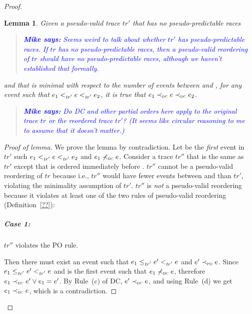 \documentclass[letter,10pt]{article}
\newtheorem{lem}{Lemma}
\newcommand{\tr}{\ensuremath{\mathit{tr}}\xspace}
\newcommand{\trPrime}{\ensuremath{\mathit{tr'}}\xspace}
\newcommand{\trDoublePrime}{\ensuremath{\mathit{tr''}}\xspace}
\newcommand{\PO}{PO\xspace}
\newcommand{\WDC}{DC\xspace}
\newcommand{\BR}{BR\xspace}
\newcommand{\WBR}{W\BR}
\newcommand{\DC}{\WDC}
\newcommand{\DCOrdered}[2]{\WDCOrdered{#1}{#2}}
\newcommand{\nDCOrdered}[2]{\nWDCOrdered{#1}{#2}}
\newcommand{\ltTRPrime}{\ensuremath{<_\textsc{\trPrime}}\xspace}
\newcommand{\ltEqTRPrime}{\ensuremath{\leq_\textsc{\trPrime}}\xspace}
\newcommand{\ltPO}{\ensuremath{\prec_\textsc{\tiny{\PO}}}\xspace}
\newcommand{\ltWDC}{\ensuremath{\prec_\textsc{\tiny{\WDC}}}\xspace}
\newcommand{\nltWDC}{\ensuremath{\not\prec_\textsc{\tiny{\WDC}}}\xspace}
\newcommand{\nltWBR}{\ensuremath{\not\prec_\textsc{\tiny{\WBR}}}\xspace}
\newcommand{\Ordered}[3]{\ensuremath{#1 #2 #3}}
\newcommand{\TRPrimeOrdered}[2]{\Ordered{#1}{\ltTRPrime}{#2}}
\newcommand{\EqTRPrimeOrdered}[2]{\Ordered{#1}{\ltEqTRPrime}{#2}}
\newcommand{\POOrdered}[2]{\Ordered{#1}{\ltPO}{#2}}
\newcommand{\WDCOrdered}[2]{\Ordered{#1}{\ltWDC}{#2}}
\newcommand{\nWDCOrdered}[2]{\Ordered{#1}{\nltWDC}{#2}}
\newcommand{\nWBROrdered}[2]{\Ordered{#1}{\nltWBR}{#2}}
\newcommand{\originalgrumbler}[2]{\begin{quote}\textcolor{blue}{\sl{\bf #1 says:} #2}\end{quote}}
\newcommand{\grumbler}[2]{\originalgrumbler{#1}{#2}}
\newcommand{\mike}[1]{\grumbler{Mike}{#1}}
\begin{document}
\begin{proof}
\begin{lem}
  Given a pseudo-valid trace \trPrime that has no pseudo-predictable races
  \mike{Seems weird to talk about whether \trPrime has pseudo-predictable races.
  If \tr has no pseudo-predictable races, then a pseudo-valid reordering of \tr should have no pseudo-predictable races, although we haven't established that formally.}
  and
  that is minimal with respect to the number of events between  and
  , for any event  such that
  \TRPrimeOrdered{\event{e}{_1}}{\TRPrimeOrdered{\event{e}}{\event{e}{_2}}}, it
  is true that \DCOrdered{\event{e}{_1}}{\DCOrdered{\event{e}}{\event{e}{_2}}}.
  \mike{Do \DC and other partial orders here apply to the original trace \tr or the reordered trace \trPrime?
  (It seems like circular reasoning to me to assume that it doesn't matter.)}
  \label{lem:wbr:dc-between-e1-e2}
\end{lem}

\begin{proof}[Proof of lemma]

  We prove the lemma by contradiction.
  Let  be the \emph{first} event in \trPrime such
  \TRPrimeOrdered{\event{e}{_1}}{\TRPrimeOrdered{\event{e}}{\event{e}{_2}}} and
  \nDCOrdered{\event{e}{_1}}{\event{e}}.
  Consider a trace \trDoublePrime that is the
  same as \trPrime except that  is ordered immediately before .
  \trDoublePrime cannot be a pseudo-valid reordering of \tr because
  i.e., \trDoublePrime would have fewer events between  and  than \trPrime,
  violating the minimality assumption of \trPrime.
  \trDoublePrime is \emph{not} a pseudo-valid reordering because it violates
  at least one of the two rules of pseudo-valid reordering (Definition~\ref{??}):

  \subparagraph{Case 1:}
  \trDoublePrime violates the \PO rule.
  
  Then there must exist an event  such that
  \EqTRPrimeOrdered{\event{e}{_1}}{\TRPrimeOrdered{\event{e}{'}}{\event{e}}} and \POOrdered{\event{e}{'}}{\event{e}}.
  Since \EqTRPrimeOrdered{\event{e}{_1}}{\TRPrimeOrdered{\event{e}{'}}{\event{e}}} and
   is the first event such that \nDCOrdered{\event{e}{_1}}{\event{e}}, 
  therefore $\DCOrdered{\event{e}{_1}}{\event{e}{'}} \lor \event{e}{_1} = \event{e}{'}$. By Rule~(c) of
  \DC, \DCOrdered{\event{e}{'}}{\event{e}}, and using Rule~(d) we get
  \DCOrdered{\event{e}{_1}}{\event{e}}, which is a contradiction.


\end{proof}
\end{proof}
\end{document}
